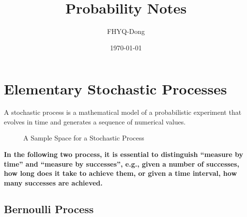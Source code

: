 \documentclass[device=normal, lang=en]{elegantbook}
\title{Probability Notes}
\author{FHYQ-Dong}
\date{\today}
\numberwithin{equation}{section}
\begin{document}
\maketitle
\frontmatter

\tableofcontents
\mainmatter
















\chapter{Elementary Stochastic Processes}
\begin{definition}
    A stochastic process is a mathematical model of a probabilistic experiment that evolves in time and generates a sequence of numerical values.
\end{definition}

\begin{figure}[H]
    \centering
    \resizebox{!}{0.3\linewidth}
    {}
    \caption{A Sample Space for a Stochastic Process}
\end{figure}

\begin{remark}
    \textbf{In the following two process, it is essential to distinguish ``measure by time'' and ``measure by successes'', e.g., given a number of successes, how long does it take to achieve them, or given a time interval, how many successes are achieved.}
\end{remark}

\section{Bernoulli Process}
\end{document}
